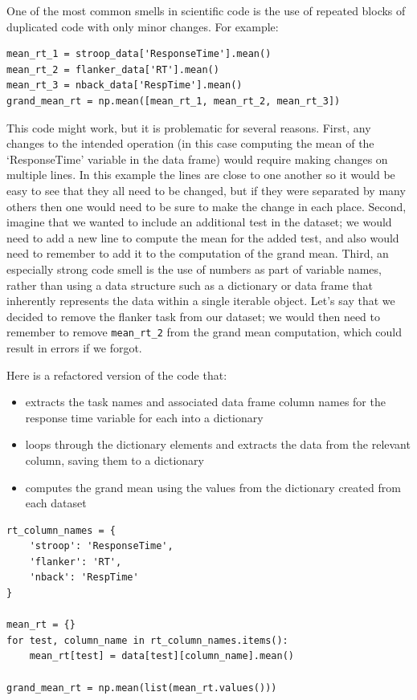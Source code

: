 One of the most common smells in scientific code is the use of repeated blocks of duplicated code with only minor changes.
For example:

\begin{lstlisting}[style=Pythonshort]
mean_rt_1 = stroop_data['ResponseTime'].mean()
mean_rt_2 = flanker_data['RT'].mean()
mean_rt_3 = nback_data['RespTime'].mean()
grand_mean_rt = np.mean([mean_rt_1, mean_rt_2, mean_rt_3])
\end{lstlisting}

This code might work,  but it is problematic for several reasons.
First, any changes to the intended operation (in this case computing the mean of the `ResponseTime' variable in the data frame) would require making changes on multiple lines.
In this example the lines are close to one another so it would be easy to see that they all need to be changed, but if they were separated by many others then one would need to be sure to make the change in each place.
Second, imagine that we wanted to include an additional test in the dataset; we would need to add a new line to compute the mean for the added test, and also would need to remember to add it to the computation of the grand mean.
Third, an especially strong code smell is the use of numbers as part of variable names, rather than using a data structure such as a dictionary or data frame that inherently represents the data within a single iterable object.
Let's say that we decided to remove the flanker task from our dataset; we would then need to remember to remove \texttt{mean\_rt\_2} from the grand mean computation, which could result in errors if we forgot.

Here is a refactored version of the code that:

\begin{itemize}
\item extracts the task names and associated data frame column names for the response time variable for each into a dictionary
\item loops through the dictionary elements and extracts the data from the relevant column, saving them to a dictionary
\item computes the grand mean using the values from the dictionary created from each dataset
\end{itemize}

\begin{lstlisting}[style=Python]
rt_column_names = {
    'stroop': 'ResponseTime',
    'flanker': 'RT',
    'nback': 'RespTime'
}

mean_rt = {}
for test, column_name in rt_column_names.items():
    mean_rt[test] = data[test][column_name].mean()

grand_mean_rt = np.mean(list(mean_rt.values()))
\end{lstlisting}

